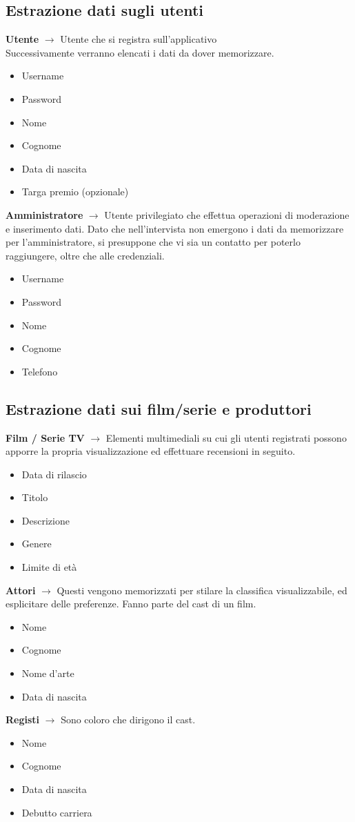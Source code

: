 \documentclass[a4paper,12pt]{report}
\begin{document}
	\subsection{Estrazione dati sugli utenti}
	\textbf{Utente} $\longrightarrow$ Utente che si registra sull'applicativo\\Successivamente verranno elencati i dati da dover memorizzare.
	\begin{itemize}
		\item Username
		\item Password
		\item Nome
		\item Cognome
		\item Data di nascita
		\item Targa premio (opzionale)
	\end{itemize}
	\textbf{Amministratore} $\longrightarrow$ Utente privilegiato che effettua operazioni di moderazione e inserimento dati. Dato che nell'intervista non emergono i dati da memorizzare per l'amministratore, si presuppone che vi sia un contatto per poterlo raggiungere, oltre che alle credenziali.
	\begin{itemize}
		\item Username
		\item Password
		\item Nome
		\item Cognome
		\item Telefono
	\end{itemize}
	\subsection{Estrazione dati sui film/serie e produttori}
	\textbf{Film / Serie TV} $\longrightarrow$ Elementi multimediali su cui gli utenti registrati possono apporre la propria visualizzazione ed effettuare recensioni in seguito.
	\begin{itemize}
		\item Data di rilascio
		\item Titolo
		\item Descrizione
		\item Genere
		\item Limite di età
	\end{itemize}
	\textbf{Attori} $\longrightarrow$ Questi vengono memorizzati per stilare la classifica visualizzabile, ed esplicitare delle preferenze. Fanno parte del cast di un film.
	\begin{itemize}
		\item Nome
		\item Cognome
		\item Nome d'arte
		\item Data di nascita
	\end{itemize}
	\textbf{Registi} $\longrightarrow$ Sono coloro che dirigono il cast.
	\begin{itemize}
		\item Nome
		\item Cognome
		\item Data di nascita
		\item Debutto carriera
	\end{itemize}
\end{document}
